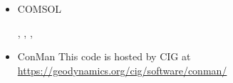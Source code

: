 \begin{itemize}
\begin{scriptsize}
\begin{itemize}
\item[\twothousandthree]     \textcite{zhpw03}
\item[\twothousandfive]      \textcite{pazw05}
\item[\twothousandtwelve]    \textcite{zhqa12}
\item[\twothousandthirteen]  \textcite{awzh13}, \textcite{zhwa13}
\item[\twothousandfourteen]  \textcite{awzh14}
\item[\twothousandsixteen]   \textcite{qizw16}
\item[\twothousandtwenty]    \textcite{bezw20}
\item[\twothousandtwentyone] \textcite{bezh21a}, \textcite{bezh21b}
\item[\twothousandtwentytwo] \textcite{kaza22}, \textcite{bezw22}, \textcite{zhka22}
\end{itemize}
\end{scriptsize}

\item {\codefont COMSOL} 

\begin{scriptsize}
\twothousandeight
\textcite{vack08}
\twothousandtwelve
\textcite{ronb12}
\twothousandfourteen
\textcite{cuwi14}
\textcite{paml14b}
\twothousandfifteen
\textcite{rasg15},
\textcite{khfh15}
\twothousandtwentyone
\textcite{chap21},
\textcite{trbs21},
\textcite{khmo21}
\textcite{lesc21}
\textcite{dasm21}
\twothousandtwentythree
\textcite{yole23}\\
\textcite{keso23}
\end{scriptsize}

\item {\codefont ConMan} 
This code is hosted by CIG at \url{https://geodynamics.org/cig/software/conman/}


\end{itemize}
